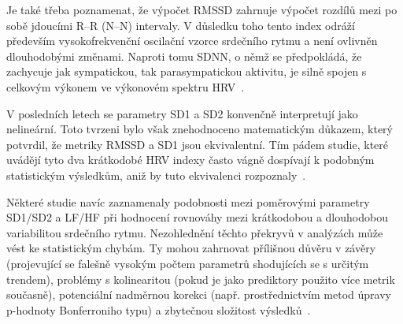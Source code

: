 Je také třeba poznamenat, že výpočet RMSSD zahrnuje výpočet rozdílů mezi po sobě
jdoucími R--R (N--N) intervaly. V důsledku toho tento index odráží především
vysokofrekvenční oscilační vzorce srdečního rytmu a není ovlivněn dlouhodobými
změnami. Naproti tomu SDNN, o němž se předpokládá, že zachycuje jak sympatickou,
tak parasympatickou aktivitu, je silně spojen s celkovým výkonem ve výkonovém
spektru \gls{HRV}~\cite{Bigger1989,Malik1996,Ishaque2021,Acharya2006}.

V posledních letech se parametry SD1 a SD2 konvenčně interpretují jako
nelineární. Toto tvrzeni bylo však znehodnoceno matematickým důkazem, který
potvrdil, že metriky RMSSD a SD1 jsou ekvivalentní. Tím pádem studie, které
uvádějí tyto dva krátkodobé \gls{HRV} indexy často vágně dospívají k podobným
statistickým výsledkům, aniž by tuto ekvivalenci
rozpoznaly~\cite{Ciccone2017,Tam2021,Leite2015,Rohila2020,Peng2015}.

Některé studie navíc zaznamenaly podobnosti mezi poměrovými parametry SD1/SD2 a
LF/HF při hodnocení rovnováhy mezi krátkodobou a dlouhodobou variabilitou
srdečního rytmu. Nezohlednění těchto překryvů v analýzách může vést ke
statistickým chybám. Ty mohou zahrnovat přílišnou důvěru v závěry (projevující
se falešně vysokým počtem parametrů shodujících se s určitým trendem), problémy
s kolinearitou (pokud je jako prediktory použito více metrik současně),
potenciální nadměrnou korekci (např. prostřednictvím metod úpravy p-hodnoty
Bonferroniho typu) a zbytečnou složitost
výsledků~\cite{Tam2021,Rohila2020,Dormman2013,Guzik2013,Brennan2002}.
